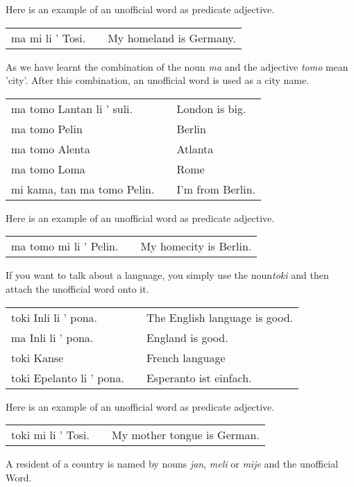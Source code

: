 Here is an example of an unofficial word as predicate adjective.

\begin{supertabular}{p{5,5cm}|ll}
ma mi li ' Tosi. && My homeland is Germany.  \\
\end{supertabular}

As we have learnt the combination of the noun \textit{ma} and the adjective \textit{tomo} mean 'city'.
After this combination, an unofficial word is used as a city name. 

\begin{supertabular}{p{5,5cm}|ll}
ma tomo Lantan li ' suli. && London is big. \\
ma tomo Pelin && Berlin \\
ma tomo Alenta && Atlanta \\
ma tomo Loma && Rome \\
mi kama, tan ma tomo Pelin. && I'm from Berlin. \\
\end{supertabular} 

Here is an example of an unofficial word as predicate adjective.

\begin{supertabular}{p{5,5cm}|ll}
ma tomo mi li ' Pelin. && My homecity is Berlin.  \\
\end{supertabular}

If you want to talk about a language, you simply use the noun\textit{toki} and then attach the unofficial word onto it. 

\begin{supertabular}{p{5,5cm}|ll}
toki Inli li ' pona. && The English language is good. \\
ma Inli li ' pona. && England is good. \\
toki Kanse && French language \\
toki Epelanto li ' pona. && Esperanto ist einfach. \\
\end{supertabular} 

Here is an example of an unofficial word as predicate adjective.

\begin{supertabular}{p{5,5cm}|ll}
toki mi li ' Tosi. && My mother tongue is German. \\
\end{supertabular}

A resident of a country is named by nouns \textit{jan}, \textit{meli} or \textit{mije} and the unofficial Word.

